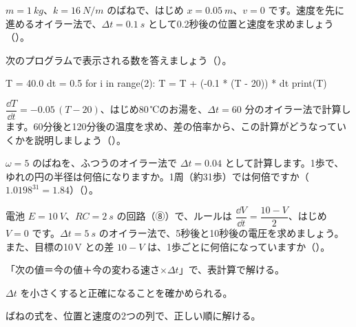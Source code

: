 \bkproblem $m=\qty{1}{kg}$、$k=\qty{16}{N/m}$ のばねで、はじめ $x=\qty{0.05}{m}$、$v=0$ です。速度を先に進めるオイラー法で、$\Delta t=\qty{0.1}{s}$ として0.2秒後の位置と速度を求めましょう\mbox{（）}。

\bkproblem 次のプログラムで表示される数を答えましょう\mbox{（）}。\par\vspace{2pt}
\begin{bkcode}
T = 40.0
dt = 0.5
for i in range(2):
    T = T + (-0.1 * (T - 20)) * dt
print(T)
\end{bkcode}


\bkproblem $\dfrac{\dd T}{\dd t}=-0.05\,(T-20)$、はじめ80\,℃のお湯を、$\Delta t=60$ 分のオイラー法で計算します。60分後と120分後の温度を求め、差の倍率から、この計算がどうなっていくかを説明しましょう\mbox{（）}。

\bkproblem $\omega=5$ のばねを、ふつうのオイラー法で $\Delta t=0.04$ として計算します。1歩で、ゆれの円の半径は何倍になりますか。1周（約31歩）では何倍ですか（$1.0198^{31}=1.84$）\mbox{（）}。

\bkproblem 電池 $E=\qty{10}{V}$、$RC=\qty{2}{s}$ の回路（⑧）で、ルールは $\dfrac{\dd V}{\dd t}=\dfrac{10-V}{2}$、はじめ $V=0$ です。$\Delta t=\qty{5}{s}$ のオイラー法で、5秒後と10秒後の電圧を求めましょう。また、目標の10\,V との差 $10-V$ は、1歩ごとに何倍になっていますか\mbox{（）}。

\begin{furikaeri}
\begin{checklist}
\item 「次の値＝今の値＋今の変わる速さ×$\Delta t$」で、表計算で解ける。
\item $\Delta t$ を小さくすると正確になることを確かめられる。
\item ばねの式を、位置と速度の2つの列で、正しい順に解ける。
\end{checklist}
\end{furikaeri}

